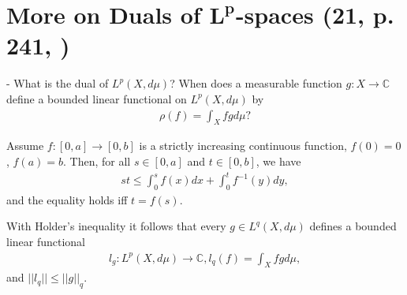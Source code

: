 \section{More on Duals of \(\boldsymbol{L^p}\)-spaces \tiny{(21, p. 241, \cite{schilling2017measures} )}}
- What is the dual of \(L^p(X,d\mu)\)? When does a measurable function \(g:X\rightarrow\mathbb{C}\) define a bounded linear functional on \(L^p(X,d\mu)\) by 
\begin{align*}
    \rho(f) = \int_X fgd\mu?
\end{align*}
\begin{theorem}
    Assume \(f:[0,a]\rightarrow[0,b]\) is a strictly increasing continuous function, \(f(0)=0\), \(f(a)=b\). Then, for all \(s\in[0,a]\) and \(t\in[0,b]\), we have 
    \begin{align*}
        st \leq \int_{0}^{s}f(x)dx + \int_{0}^{t}f^{-1}(y)dy,
    \end{align*}
    and the equality holds iff \(t= f(s)\).
\end{theorem}
With Holder's inequality it follows that every \(g\in L^q(X,d\mu)\) defines a bounded linear functional 
\begin{align*}
    l_g : L^p(X,d\mu) \rightarrow \mathbb{C}, l_q(f) = \int_X fgd\mu,
\end{align*}
and \(||l_q||\leq ||g||_q\).

